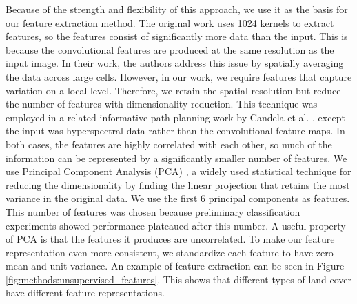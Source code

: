 Because of the strength and flexibility of this approach, we use it as the basis for our feature extraction method. The original work uses 1024 kernels to extract features, so the features consist of significantly more data than the input. This is because the convolutional features are produced at the same resolution as the input image. In their work, the authors address this issue by spatially averaging the data across large cells. However, in our work, we require features that capture variation on a local level. Therefore, we retain the spatial resolution but reduce the number of features with dimensionality reduction. This technique was employed in a related informative path planning work by Candela et al. \cite{Candela2020PlanetaryMapping}, except the input was hyperspectral data rather than the convolutional feature maps. In both cases, the features are highly correlated with each other, so much of the information can be represented by a significantly smaller number of features. We use Principal Component Analysis (PCA) \cite{Jollife2016PrincipalDevelopments}, a widely used statistical technique for reducing the dimensionality by finding the linear projection that retains the most variance in the original data. We use the first 6 principal components as features. This number of features was chosen because preliminary classification experiments showed performance plateaued after this number. A useful property of PCA is that the features it produces are uncorrelated. To make our feature representation even more consistent, we standardize each feature to have zero mean and unit variance. An example of feature extraction can be seen in Figure \ref{fig:methods:unsupervised_features}. This shows that different types of land cover have different feature representations.

